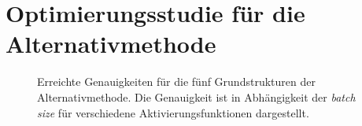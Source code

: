 \chapter{Optimierungsstudie für die Alternativmethode}
%
\begin{figure}[h!]
  \hspace{20pt}
  \caption{Erreichte Genauigkeiten für die fünf Grundstrukturen der Alternativmethode. Die Genauigkeit ist in Abhängigkeit der \textit{batch size} für verschiedene Aktivierungsfunktionen dargestellt.}
  \label{fig:accs}
\end{figure}

